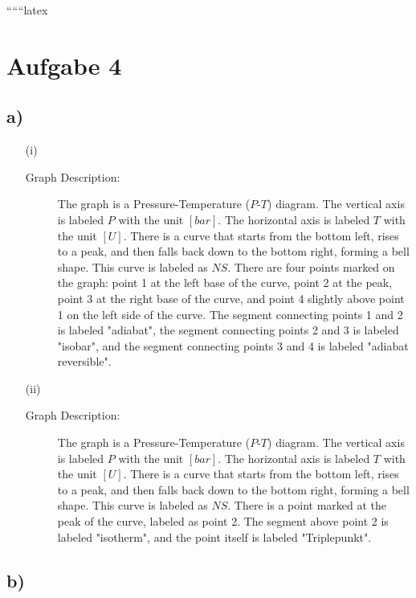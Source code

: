 
``````latex


\section*{Aufgabe 4}

\subsection*{a)}

\begin{itemize}
    \item[(i)] 
    \begin{description}
        \item[Graph Description:] 
        The graph is a Pressure-Temperature ($P$-$T$) diagram. The vertical axis is labeled $P$ with the unit $[bar]$. The horizontal axis is labeled $T$ with the unit $[U]$. There is a curve that starts from the bottom left, rises to a peak, and then falls back down to the bottom right, forming a bell shape. This curve is labeled as $NS$. There are four points marked on the graph: point 1 at the left base of the curve, point 2 at the peak, point 3 at the right base of the curve, and point 4 slightly above point 1 on the left side of the curve. The segment connecting points 1 and 2 is labeled "adiabat", the segment connecting points 2 and 3 is labeled "isobar", and the segment connecting points 3 and 4 is labeled "adiabat reversible".
    \end{description}

    \item[(ii)] 
    \begin{description}
        \item[Graph Description:] 
        The graph is a Pressure-Temperature ($P$-$T$) diagram. The vertical axis is labeled $P$ with the unit $[bar]$. The horizontal axis is labeled $T$ with the unit $[U]$. There is a curve that starts from the bottom left, rises to a peak, and then falls back down to the bottom right, forming a bell shape. This curve is labeled as $NS$. There is a point marked at the peak of the curve, labeled as point 2. The segment above point 2 is labeled "isotherm", and the point itself is labeled "Triplepunkt".
    \end{description}
\end{itemize}

\subsection*{b)}

